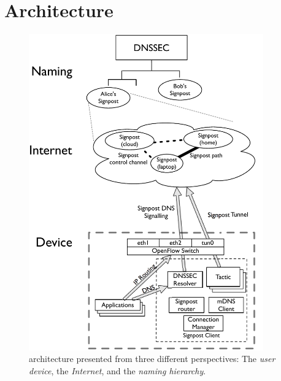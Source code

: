 \section{\signpost Architecture}\label{sec:signpost-architecture}

\begin{figure}
  \begin{center}
	\includegraphics[width=0.9\textwidth]{Chapter3/Chapter3Figs/signpost-arch}
  \end{center}
  \caption[\signpost architecture.]{\signpost architecture presented from three different
    perspectives: The {\it user device}, the {\it Internet}, and the {\it naming hierarchy}.}
  \label{fig:signpost-arch}
\end{figure}


